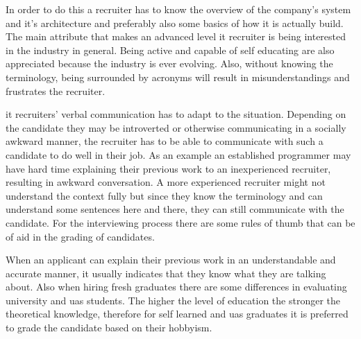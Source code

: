 \documentclass[11pt,a4paper,oneside,article]{memoir}
\begin{document}
In order to do this a recruiter has to know the overview of the company's system and it's architecture and preferably also some basics of how it is actually build. The main attribute that makes an advanced level \gls{it} recruiter is being interested in the industry in general. Being active and capable of self educating are also appreciated because the industry is ever evolving. Also, without knowing the terminology, being surrounded by acronyms will result in misunderstandings and frustrates the recruiter. \cite{noora:conversation}

\gls{it} recruiters' verbal communication has to adapt to the situation. Depending on the candidate they may be introverted or otherwise communicating in a socially awkward manner, the recruiter has to be able to communicate with such a candidate to do well in their job. As an example an established programmer may have hard time explaining their previous work to an inexperienced recruiter, resulting in awkward conversation. A more experienced recruiter might not understand the context fully but since they know the terminology and can understand some sentences here and there, they can still communicate with the candidate. For the interviewing process there are some rules of thumb that can be of aid in the grading of candidates.

When an applicant can explain their previous work in an understandable and accurate manner, it usually indicates that they know what they are talking about. Also when hiring fresh graduates there are some differences in evaluating university and \gls{uas} students. The higher the level of education the stronger the theoretical knowledge, therefore for self learned and \gls{uas} graduates it is preferred to grade the candidate based on their hobbyism. \cite{noora:conversation}


\end{document}
